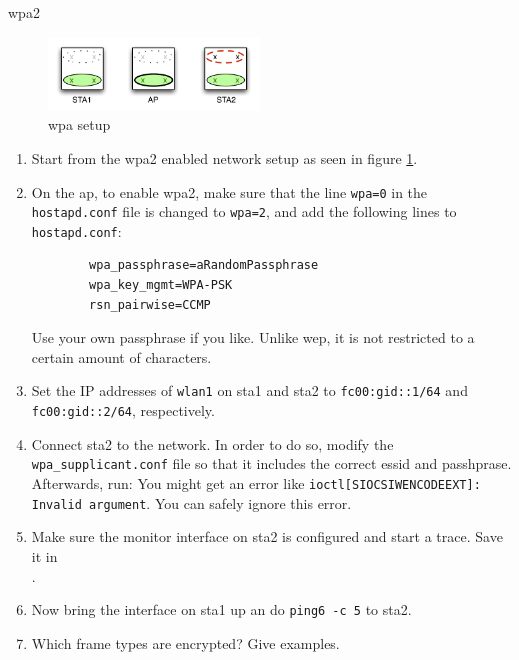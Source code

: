 \begin{exercise}{\acs{wpa}2}

\begin{figure}[h!]
		\begin{center}
			\includegraphics[width=0.5\textwidth]{images/wepcrack.pdf}
			\caption{\acs{wpa} setup} 
			\label{fig:wpa} 
		\end{center}
	\end{figure}

\begin{enumerate}
	\item Start from the \ac{wpa}2 enabled network setup as seen in figure \ref{fig:wpa}.
	\item On the \ac{ap}, to enable \ac{wpa}2, make sure that the line \texttt{wpa=0} in the \texttt{hostapd.conf} file is changed to \texttt{wpa=2}, and add the following lines to \texttt{hostapd.conf}:
	\begin{verbatim}
		wpa_passphrase=aRandomPassphrase
		wpa_key_mgmt=WPA-PSK
		rsn_pairwise=CCMP
	\end{verbatim}
	\remark Use your own passphrase if you like. Unlike \ac{wep}, it is not restricted to a certain amount of characters.
	\item Set the IP addresses of \texttt{wlan1} on \ac{sta}1 and \ac{sta}2 to \texttt{fc00:\acs{gid}::1/64} and \texttt{fc00:\acs{gid}::2/64}, respectively.
	\item Connect \ac{sta}2 to the network. In order to do so, modify the \texttt{wpa\_supplicant.conf} file so that it includes the correct \acs{essid} and passhprase. Afterwards, run:\newline
	\remark You might get an error like \texttt{ioctl[SIOCSIWENCODEEXT]: Invalid argument}. You can safely ignore this error.
	\item Make sure the monitor interface on \ac{sta}2 is configured and start a trace. Save it in \\.
	\item Now bring the interface on \ac{sta}1 up an do \texttt{ping6 -c 5} to \ac{sta}2.
	\item Which frame types are encrypted? Give examples.\newline

\end{enumerate}
\end{exercise}

